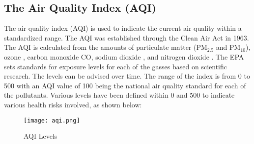 \subsection{The Air Quality Index (AQI)}
The air quality index (AQI) is used to indicate the current air quality within a
standardized range. The AQI was established through the Clean Air Act in 1963.
The AQI is calculated from the amounts of particulate matter (PM$_{2.5}$ and
PM$_{10}$), ozone \ozone, carbon monoxide CO, sodium dioxide \sdo, and nitrogen
dioxide \ndo. The EPA sets standards for exposure levels for each of the gasses
based on scientific research. The levels can be advised over time. The range of
the index is from 0 to 500 with an AQI value of 100 being the national air
quality standard for each of the pollutants. Various levels have been defined
within 0 and 500 to indicate various health risks involved, as shown below:

\begin{figure}[h]
\centering
\texttt{[image: aqi.png]}
\caption{AQI Levels}
\label{fig:aqiLevels}
\end{figure}


